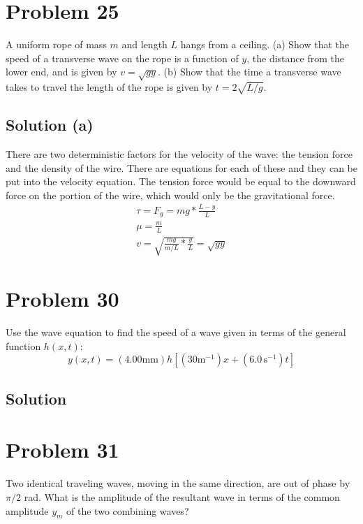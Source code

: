 \documentclass[12pt]{article}
\begin{document}
    \pagebreak
    \section{Problem 25}
        A uniform rope of mass $m$ and length $L$ hangs from a ceiling. 
        (a) Show that the speed of a transverse wave on the rope is a function of $y$, the distance from the lower end, and is given by $v = \sqrt{gy}$.
        (b) Show that the time a transverse wave takes to travel the length of the rope is given by $t = 2\sqrt{L/g}$.

        \subsection{Solution (a)}
            There are two deterministic factors for the velocity of the wave: the tension force and the density of the wire. 
            There are equations for each of these and they can be put into the velocity equation.
            The tension force would be equal to the downward force on the portion of the wire, which would only be the gravitational force.
            \begin{gather}
                \tau    =   F_g
                    =   mg * \frac{L - y}{L}\\
                \mu =   \frac{m}{L}\\
                v   =   \sqrt{\frac{mg}{m/L} * \frac{y}{L}}
                    =   \sqrt{gy}
            \end{gather}

    \section{Problem 30}
        Use the wave equation to find the speed of a wave given in terms of the general function $h(x, t)$:
        \begin{equation}
            y(x, t) = (4.00 \unit{\milli\meter}) h[(30 \unit{\meter^{-1}})x + (6.0\,\unit{\second^{-1}})t]
        \end{equation}

        \subsection{Solution}

    \section{Problem 31}
        Two identical traveling waves, moving in the same direction, are out of phase by $\pi/2$ rad. 
        What is the amplitude of the resultant wave in terms of the common amplitude $y_m$ of the two combining waves?
\end{document}
